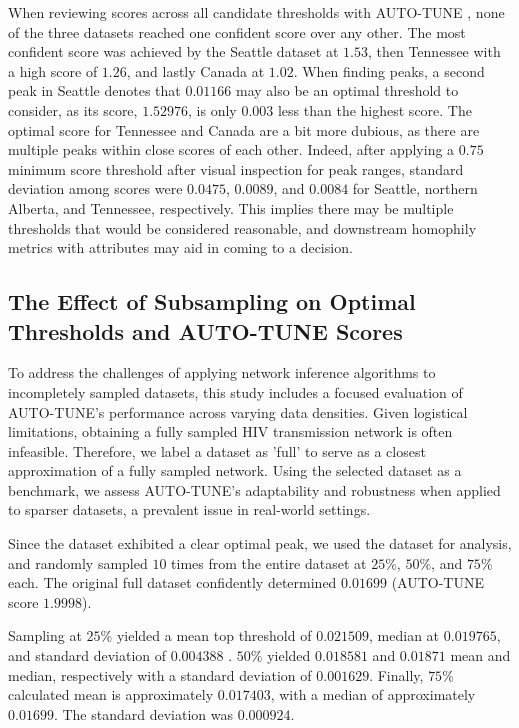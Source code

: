 \documentclass[utf8]{FrontiersinHarvard} %
\begin{document}

When reviewing scores across all candidate thresholds with AUTO-TUNE
\label{fig:clustuner}, none of the three datasets reached one confident score
over any other. The most confident score was achieved by the Seattle dataset at
$1.53$, then Tennessee with a high score of $1.26$, and lastly Canada at
$1.02$. When finding peaks, a second peak in Seattle denotes that $0.01166$ may
also be an optimal threshold to consider, as its score, $1.52976$, is only
$0.003$ less than the highest score. The optimal score for Tennessee and Canada
are a bit more dubious, as there are multiple peaks within close scores of each
other. Indeed, after applying a $0.75$ minimum score threshold after visual
inspection for peak ranges, standard deviation among scores were $0.0475$,
$0.0089$, and $0.0084$ for Seattle, northern Alberta, and Tennessee,
respectively. This implies there may be multiple thresholds that would be
considered reasonable, and downstream homophily metrics with attributes may aid
in coming to a decision.

\subsection{The Effect of Subsampling on Optimal Thresholds and AUTO-TUNE Scores}

To address the challenges of applying network inference algorithms to
incompletely sampled datasets, this study includes a focused evaluation of
AUTO-TUNE's performance across varying data densities. Given logistical
limitations, obtaining a fully sampled HIV transmission network is often
infeasible. Therefore, we label a dataset as 'full' to serve as a closest
approximation of a fully sampled network. Using the selected dataset as a
benchmark, we assess AUTO-TUNE's adaptability and robustness when applied to
sparser datasets, a prevalent issue in real-world settings.

Since the \citep{rhee_national_2019} dataset exhibited a clear optimal peak, we
used the dataset for analysis, and randomly sampled $10$ times from the entire
dataset at $25\%$, $50\%$, and $75\%$ each. The original full dataset
confidently determined $0.01699$ (AUTO-TUNE score $1.9998$).

Sampling at $25\%$ yielded a mean top threshold of $0.021509$, median at
$0.019765$, and standard deviation of $0.004388$ \label{fig:subsampling}.
$50\%$ yielded $0.018581$ and $0.01871$ mean and median, respectively with a
standard deviation of $0.001629$. Finally, $75\%$ calculated mean is
approximately $0.017403$, with a median of approximately $0.01699$. The
standard deviation was $0.000924$.
\end{document}
